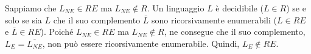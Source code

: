 \documentclass[a4paper]{article}
\theoremstyle{definition} %
\begin{document}
Sappiamo che $L_{NE} \in RE$ ma $L_{NE} \notin R$.
Un linguaggio $L$ è decidibile ($L \in R$) se e solo se sia $L$ che il suo complemento $\bar{L}$ sono ricorsivamente enumerabili ($L \in RE$ e $\bar{L} \in RE$).
Poiché $L_{NE} \in RE$ ma $L_{NE} \notin R$, ne consegue che il suo complemento, $L_E = \overline{L_{NE}}$, non può essere ricorsivamente enumerabile.
Quindi, $L_E \notin RE$.
\end{document}
